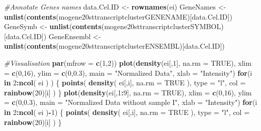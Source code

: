 \documentclass[]{article}
\newenvironment{Shaded}{\begin{snugshade}}{\end{snugshade}}
\newcommand{\KeywordTok}[1]{\textcolor[rgb]{0.13,0.29,0.53}{\textbf{#1}}}
\newcommand{\DataTypeTok}[1]{\textcolor[rgb]{0.13,0.29,0.53}{#1}}
\newcommand{\DecValTok}[1]{\textcolor[rgb]{0.00,0.00,0.81}{#1}}
\newcommand{\FloatTok}[1]{\textcolor[rgb]{0.00,0.00,0.81}{#1}}
\newcommand{\StringTok}[1]{\textcolor[rgb]{0.31,0.60,0.02}{#1}}
\newcommand{\CommentTok}[1]{\textcolor[rgb]{0.56,0.35,0.01}{\textit{#1}}}
\newcommand{\OtherTok}[1]{\textcolor[rgb]{0.56,0.35,0.01}{#1}}
\newcommand{\ControlFlowTok}[1]{\textcolor[rgb]{0.13,0.29,0.53}{\textbf{#1}}}
\newcommand{\OperatorTok}[1]{\textcolor[rgb]{0.81,0.36,0.00}{\textbf{#1}}}
\newcommand{\NormalTok}[1]{#1}
\begin{document}
\begin{Shaded}
\begin{Highlighting}[]
\CommentTok{#Annotate Genes names}
\NormalTok{data.Cel.ID <-}\StringTok{ }\KeywordTok{rownames}\NormalTok{(ei)}
\NormalTok{GeneNames <-}\StringTok{ }\KeywordTok{unlist}\NormalTok{(}\KeywordTok{contents}\NormalTok{(mogene20sttranscriptclusterGENENAME)[data.Cel.ID])}
\NormalTok{GeneSymb <-}\StringTok{ }\KeywordTok{unlist}\NormalTok{(}\KeywordTok{contents}\NormalTok{(mogene20sttranscriptclusterSYMBOL)[data.Cel.ID])}
\NormalTok{GeneEnsembl <-}\StringTok{ }\KeywordTok{unlist}\NormalTok{(}\KeywordTok{contents}\NormalTok{(mogene20sttranscriptclusterENSEMBL)[data.Cel.ID])}

\CommentTok{#Visualisation}
\KeywordTok{par}\NormalTok{(}\DataTypeTok{mfrow =} \KeywordTok{c}\NormalTok{(}\DecValTok{1}\NormalTok{,}\DecValTok{2}\NormalTok{))}
\KeywordTok{plot}\NormalTok{(}\KeywordTok{density}\NormalTok{(ei[,}\DecValTok{1}\NormalTok{], }\DataTypeTok{na.rm =} \OtherTok{TRUE}\NormalTok{), }\DataTypeTok{xlim =} \KeywordTok{c}\NormalTok{(}\DecValTok{0}\NormalTok{,}\DecValTok{16}\NormalTok{), }\DataTypeTok{ylim =} \KeywordTok{c}\NormalTok{(}\DecValTok{0}\NormalTok{,}\FloatTok{0.3}\NormalTok{), main}
\NormalTok{     =}\StringTok{ "Normalized Data"}\NormalTok{, }\DataTypeTok{xlab =} \StringTok{"Intensity"}\NormalTok{)}
\ControlFlowTok{for}\NormalTok{(i }\ControlFlowTok{in} \DecValTok{2}\OperatorTok{:}\KeywordTok{ncol}\NormalTok{( ei ) ) \{}
  \KeywordTok{points}\NormalTok{( }\KeywordTok{density}\NormalTok{( ei[,i], }\DataTypeTok{na.rm =} \OtherTok{TRUE}\NormalTok{ ), }\DataTypeTok{type =} \StringTok{"l"}\NormalTok{, }\DataTypeTok{col =} \KeywordTok{rainbow}\NormalTok{(}\DecValTok{20}\NormalTok{)[i] )}
\NormalTok{\}}
\KeywordTok{plot}\NormalTok{(}\KeywordTok{density}\NormalTok{(ei[,}\DecValTok{1}\OperatorTok{:}\DecValTok{9}\NormalTok{], }\DataTypeTok{na.rm =} \OtherTok{TRUE}\NormalTok{), }\DataTypeTok{xlim =} \KeywordTok{c}\NormalTok{(}\DecValTok{0}\NormalTok{,}\DecValTok{16}\NormalTok{), }\DataTypeTok{ylim =} \KeywordTok{c}\NormalTok{(}\DecValTok{0}\NormalTok{,}\FloatTok{0.3}\NormalTok{), main}
\NormalTok{     =}\StringTok{ "Normalized Data without sample I"}\NormalTok{, }\DataTypeTok{xlab =} \StringTok{"Intensity"}\NormalTok{)}
\ControlFlowTok{for}\NormalTok{(i }\ControlFlowTok{in} \DecValTok{2}\OperatorTok{:}\KeywordTok{ncol}\NormalTok{( ei )}\OperatorTok{-}\DecValTok{1}\NormalTok{) \{}
  \KeywordTok{points}\NormalTok{( }\KeywordTok{density}\NormalTok{( ei[,i], }\DataTypeTok{na.rm =} \OtherTok{TRUE}\NormalTok{ ), }\DataTypeTok{type =} \StringTok{"l"}\NormalTok{, }\DataTypeTok{col =} \KeywordTok{rainbow}\NormalTok{(}\DecValTok{20}\NormalTok{)[i] )}
\NormalTok{\}}
\end{Highlighting}
\end{Shaded}
\end{document}
